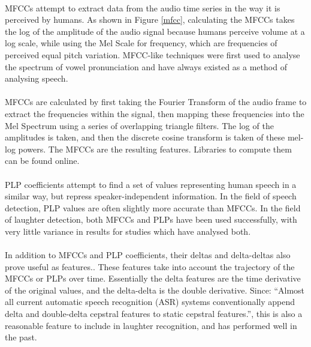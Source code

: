 \documentclass[a4paper,11pt,notitlepage]{article}
\begin{document}
\\
MFCCs attempt to extract data from the audio time series in the way it is perceived by humans. As shown in Figure \ref{mfcc}, calculating the MFCCs takes the log of the amplitude of the audio signal because humans perceive volume at a log scale, while using the Mel Scale for frequency, which are frequencies of perceived equal pitch variation. MFCC-like techniques were first used to analyse the spectrum of vowel pronunciation and have always existed as a method of analysing speech.\\
\\
MFCCs are calculated by first taking the Fourier Transform of the audio frame to extract the frequencies within the signal, then mapping these frequencies into the Mel Spectrum using a series of overlapping triangle filters. The log of the amplitudes is taken, and then the discrete cosine transform is taken of these mel-log powers. The MFCCs are the resulting features. Libraries to compute them can be found online\cite{Ellis05-rastamat}.\\
\\
PLP coefficients attempt to find a set of values representing human speech in a similar way, but repress speaker-independent information. In the field of speech detection, PLP values are often slightly more accurate than MFCCs.\cite{psutka2001comparison} In the field of laughter detection, both MFCCs\cite{knox2007automatic,gosztolya2016laughter,kennedy2004laughter} and PLPs \cite{gosztolya2016laughter,truong2007automatic,truong2005automatic} have been used successfully, with very little variance in results for studies which have analysed both.\cite{gosztolya2016laughter}\\
\\
In addition to MFCCs and PLP coefficients, their deltas and delta-deltas also prove useful as features.\cite{knox2007automatic}. These features take into account the trajectory of the MFCCs or PLPs over time. Essentially the delta features are the time derivative of the original values, and the delta-delta is the double derivative. Since: ``Almost all current automatic speech recognition (ASR) systems conventionally append delta and double-delta cepstral features to static cepstral features.'',\cite{kumar2011delta} this is also a reasonable feature to include in laughter recognition, and has performed well in the past.\cite{knox2007automatic}
\end{document}
